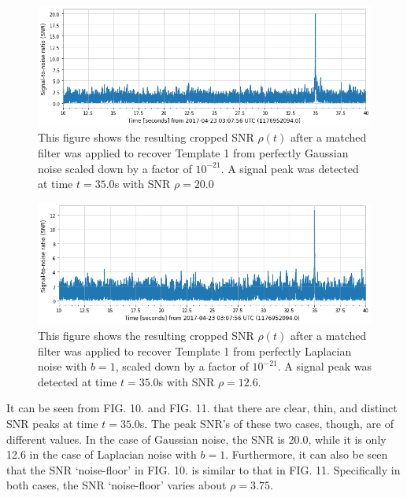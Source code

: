 \documentclass[reprint,
letterpaper,
 amsmath,amssymb,
 aps,
]{revtex4-2}
\begin{document}
\begin{figure}[h]
\caption{This figure shows the resulting cropped SNR $\rho(t)$ after a matched filter was applied to recover Template 1 from perfectly Gaussian noise scaled down by a factor of $10^{-21}$. A signal peak was detected at time $t = 35.0$s with SNR $\rho = 20.0$}
\includegraphics[scale = .33]{gaussian -21 template 1.png}
\centering
\end{figure} 

\begin{figure}[h!]
\caption{This figure shows the resulting cropped SNR $\rho(t)$ after a matched filter was applied to recover Template 1 from perfectly Laplacian noise with $b=1$, scaled down by a factor of $10^{-21}$. A signal peak was detected at time $t = 35.0$s with SNR $\rho = 12.6$.}
\includegraphics[scale = .33]{laplacian b=1 template 1.png}
\centering
\end{figure} 
It can be seen from FIG. 10. and FIG. 11. that there are clear, thin, and distinct SNR peaks at time $t = 35.0$s. The peak SNR's of these two cases, though, are of different values. In the case of Gaussian noise, the SNR is 20.0, while it is only 12.6 in the case of Laplacian noise with $b=1$. Furthermore, it can also be seen that the SNR `noise-floor' in FIG. 10. is similar to that in FIG. 11. Specifically in both cases, the SNR `noise-floor' varies about $\rho = 3.75$. 
\end{document}
